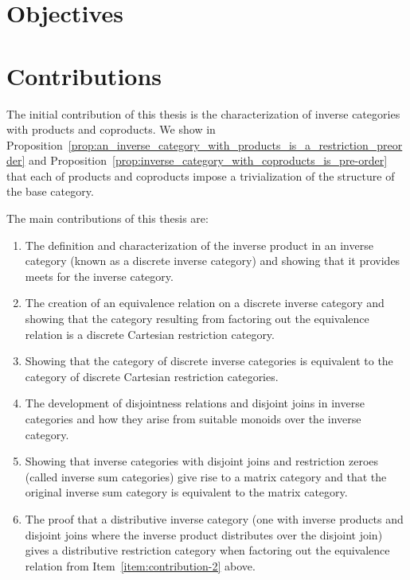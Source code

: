 \section{Objectives}
\label{sec:objectives}

\section{Contributions}
\label{sec:contributions}

The initial contribution of this thesis is the characterization of inverse categories with products
and coproducts.
We show in Proposition~\ref{prop:an_inverse_category_with_products_is_a_restriction_preorder}
and Proposition~\ref{prop:inverse_category_with_coproducts_is_pre-order} that each of products and
coproducts impose a trivialization of the structure of the base category.

The main contributions of this thesis are:
\begin{enumerate}
\item The definition and characterization of the inverse product in an inverse category (known as a
  discrete inverse category) and showing  that it provides meets for the inverse category.
\item The creation of an equivalence relation on a discrete inverse category and showing that the
  category resulting from factoring out the equivalence relation is a discrete Cartesian restriction
  category.\label{item:contribution-2}
\item Showing that the category of discrete inverse categories is equivalent to the category of
  discrete Cartesian restriction categories.
\item The development of disjointness relations and disjoint joins in inverse categories and how
  they arise from suitable monoids over the inverse category.
\item Showing that inverse categories with disjoint joins and restriction zeroes (called inverse sum
  categories) give rise to a matrix category and that the original inverse sum category is
  equivalent to the matrix category.
\item The proof that a distributive inverse category (one with inverse products and disjoint joins
  where the inverse product distributes over the disjoint join) gives a distributive restriction
  category when factoring out the equivalence relation from Item~\ref{item:contribution-2} above.
\end{enumerate}

